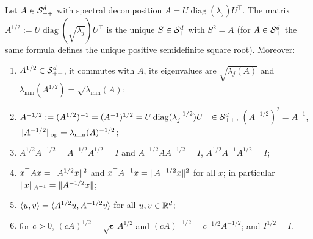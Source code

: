 \begin{lemma}\label{lem:sqrt_props}
Let $A \in \mathcal{S}_{++}^{d}$ with spectral decomposition $A = U\operatorname{diag}(\lambda_j)U^\top$. The
matrix $A^{1/2} := U\operatorname{diag}(\sqrt{\lambda_j})U^\top$ is the unique $S \in \mathcal{S}_{+}^{d}$ with
$S^2 = A$ (for $A \in \mathcal{S}_{+}^{d}$ the same formula defines the unique positive semidefinite square
root). Moreover:
\begin{enumerate}
  \item[(i)] $A^{1/2} \in \mathcal{S}_{++}^{d}$, it commutes with $A$, its eigenvalues are $\sqrt{\lambda_j(A)}$
        and $\lambda_{\min}(A^{1/2}) = \sqrt{\lambda_{\min}(A)}$;
  \item[(ii)] $A^{-1/2} := (A^{1/2})^{-1} = (A^{-1})^{1/2} = U\operatorname{diag}(\lambda_j^{-1/2})U^\top
        \in \mathcal{S}_{++}^{d}$, $(A^{-1/2})^2 = A^{-1}$, $\lVert A^{-1/2} \rVert_{\mathrm{op}} = \lambda_{\min}(A)^{-1/2}$;
  \item[(iii)] $A^{1/2} A^{-1/2} = A^{-1/2} A^{1/2} = I$ and $A^{-1/2} A A^{-1/2} = I$,
        $A^{1/2} A^{-1} A^{1/2} = I$;
  \item[(iv)] $x^\top A x = \lVert A^{1/2}x \rVert^2$ and $x^\top A^{-1} x = \lVert A^{-1/2}x \rVert^2$ for all
        $x$; in particular $\lVert x \rVert_{A^{-1}} = \lVert A^{-1/2}x \rVert$;
  \item[(v)] $\langle u, v \rangle = \langle A^{1/2}u, A^{-1/2}v \rangle$ for all $u, v \in \mathbb{R}^d$;
  \item[(vi)] for $c > 0$, $(cA)^{1/2} = \sqrt c\, A^{1/2}$ and $(cA)^{-1/2} = c^{-1/2}A^{-1/2}$;
        and $I^{1/2} = I$.
\end{enumerate}
\end{lemma}

